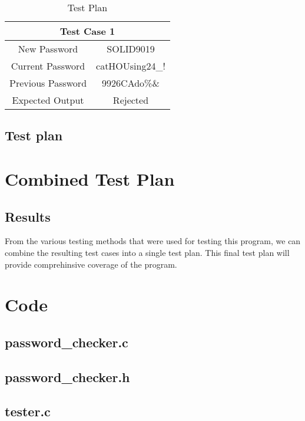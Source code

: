 \documentclass[12pt,letterpaper]{article}
\begin{document}
\begin{table}[h]
  \caption{Test Plan}
  \label{tab:Decision test cases}
  
  \begin{tabular}{||c|c||}
    \hline
    \multicolumn{2}{||c||}{Test Case 1} \\
    \hline
    New Password & SOLID9019 \\
    \hline
    Current Password & catHOUsing24\_! \\
    \hline
    Previous Password & 9926CAdo\%\& \\
    \hline
    Expected Output & Rejected \\
    \hline
  \end{tabular}
\end{table}

\subsection{Test plan}


\section{Combined Test Plan}

\subsection{Results}

From the various testing methods that were used for testing this program,
we can combine the resulting test cases into a single test plan. This final
test plan will provide comprehinsive coverage of the program.




\section{Code}

\subsection{password\_checker.c}




\subsection{password\_checker.h}



\subsection{tester.c}


\end{document}
